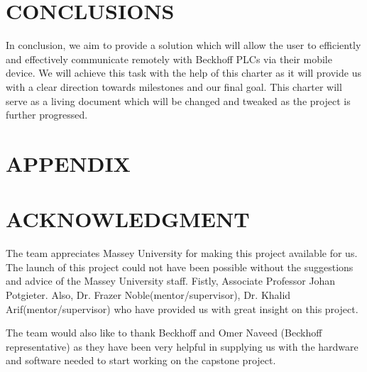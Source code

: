 \documentclass[a4paper, 10pt, conference]{IEEEconf}
\begin{document}
\section{CONCLUSIONS}
In conclusion, we aim to provide a solution which will allow the user to efficiently and effectively communicate remotely with Beckhoff PLCs via their mobile device. We will achieve this task with the help of this charter as it will provide us with a clear direction towards milestones and our final goal. This charter will serve as a living document which will be changed and tweaked as the project is further progressed.

\addtolength{\textheight}{-12cm}   %


\section*{APPENDIX}


\section*{ACKNOWLEDGMENT}
The team appreciates Massey University for making this project available for us. The launch of this project could not have been possible without the suggestions and advice of the Massey University staff. Fistly, Associate Professor Johan Potgieter. Also, Dr. Frazer Noble(mentor/supervisor), Dr. Khalid Arif(mentor/supervisor) who have provided us with great insight on this project. 

The team would also like to thank Beckhoff and Omer Naveed (Beckhoff representative) as they have been very helpful in supplying us with the hardware and software needed to start working on the capstone project. 


\nocite{*}
\nocite{key}


\end{document}

